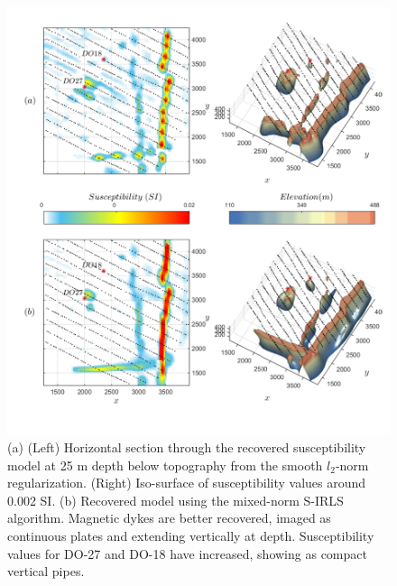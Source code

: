 \begin{figure}[p]
\centering
\includegraphics[scale=0.60]{TKC_Mag_Models}
\caption{(a) (Left) Horizontal section through the recovered susceptibility model at 25 m depth below topography from the smooth $l_2$-norm regularization. (Right) Iso-surface of susceptibility values around 0.002 SI.
(b) Recovered model using the mixed-norm S-IRLS algorithm. Magnetic dykes are better recovered, imaged as continuous plates and extending vertically at depth. Susceptibility values for DO-27 and DO-18 have increased, showing as compact vertical pipes.}
\label{fig:TKC_Mag_Models}
\end{figure}

